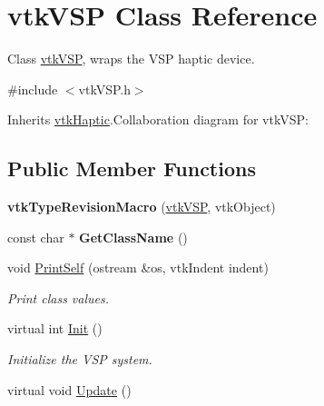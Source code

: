 \hypertarget{classvtkVSP}{
\section{vtkVSP Class Reference}
\label{classvtkVSP}
}


Class \hyperlink{classvtkVSP}{vtkVSP}, wraps the VSP haptic device.  


{\ttfamily \#include $<$vtkVSP.h$>$}

Inherits \hyperlink{classvtkHaptic}{vtkHaptic}.Collaboration diagram for vtkVSP:\subsection*{Public Member Functions}
\begin{DoxyCompactItemize}
\item 
\hypertarget{classvtkVSP_aec56264131580b3029ef3647730934ee}{
{\bfseries vtkTypeRevisionMacro} (\hyperlink{classvtkVSP}{vtkVSP}, vtkObject)}
\label{classvtkVSP_aec56264131580b3029ef3647730934ee}

\item 
\hypertarget{classvtkVSP_a74a399b542a119b33800a25816fb3ee5}{
const char $\ast$ {\bfseries GetClassName} ()}
\label{classvtkVSP_a74a399b542a119b33800a25816fb3ee5}

\item 
\hypertarget{classvtkVSP_aff2c09d180386b3633f19785d339bac1}{
void \hyperlink{classvtkVSP_aff2c09d180386b3633f19785d339bac1}{PrintSelf} (ostream \&os, vtkIndent indent)}
\label{classvtkVSP_aff2c09d180386b3633f19785d339bac1}

\begin{DoxyCompactList}\small\item\em Print class values. \item\end{DoxyCompactList}\item 
\hypertarget{classvtkVSP_a4b48949e4b916ebd142ef165d9e6897a}{
virtual int \hyperlink{classvtkVSP_a4b48949e4b916ebd142ef165d9e6897a}{Init} ()}
\label{classvtkVSP_a4b48949e4b916ebd142ef165d9e6897a}

\begin{DoxyCompactList}\small\item\em Initialize the VSP system. \item\end{DoxyCompactList}\item 
\hypertarget{classvtkVSP_a84afcaaf6dab2a0fe19b7021e44796e7}{
virtual void \hyperlink{classvtkVSP_a84afcaaf6dab2a0fe19b7021e44796e7}{Update} ()}
\label{classvtkVSP_a84afcaaf6dab2a0fe19b7021e44796e7}


\end{DoxyCompactItemize}
